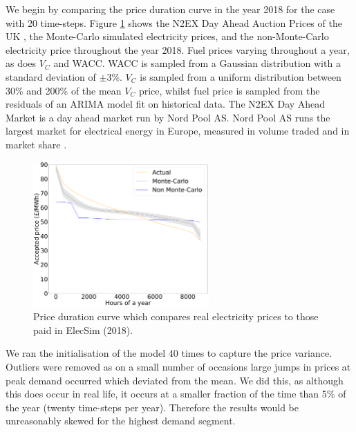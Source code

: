 We begin by comparing the price duration curve in the year 2018 for the case with 20 time-steps. Figure \ref{fig:price_duration_curve} shows the N2EX Day Ahead Auction Prices of the UK \cite{nordpool_2019}, the Monte-Carlo simulated electricity prices, and the non-Monte-Carlo electricity price throughout the year 2018. Fuel prices varying throughout a year, as does $V_C$ and WACC. WACC is sampled from a Gaussian distribution with a standard deviation of $\pm3$\%. $V_C$ is sampled from a uniform distribution between 30\% and 200\% of the mean $V_C$ price, whilst fuel price is sampled from the residuals of an ARIMA model fit on historical data. The N2EX Day Ahead Market is a day ahead market run by Nord Pool AS. Nord Pool AS runs the largest market for electrical energy in Europe, measured in volume traded and in market share \cite{nordpool_2019}.



\begin{figure}
	\begin{center}
		\includegraphics[width=0.6\textwidth]{Chapter4/figures/load_price_duration_curve_comparison-monte-carlo.pdf}
		\caption{Price duration curve which compares real electricity prices to those paid in ElecSim (2018).}
		\label{fig:price_duration_curve}
	\end{center}
\end{figure}






We ran the initialisation of the model 40 times to capture the price variance. Outliers were removed as on a small number of occasions large jumps in prices at peak demand occurred which deviated from the mean. We did this, as although this does occur in real life, it occurs at a smaller fraction of the time than 5\% of the year (twenty time-steps per year). Therefore the results would be unreasonably skewed for the highest demand segment. 


